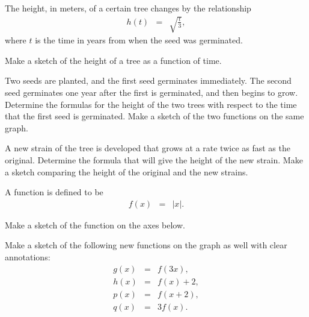 \begin{problem}
\item The height, in meters, of a certain tree changes by the
  relationship
  \begin{eqnarray*}
    h(t) & = & \sqrt{\frac{t}{3}},
  \end{eqnarray*}
  where $t$ is the time in years from when the seed was germinated. 
  \begin{subproblem}
  \item Make a sketch of the height of a tree as a function of time.
    \vfill
  \item Two seeds are planted, and the first seed germinates
    immediately. The second seed germinates one year after the first
    is germinated, and then begins to grow. Determine the formulas for
    the height of the two trees with respect to the time that the
    first seed is germinated. Make a sketch of the two functions on
    the same graph.  
    \vfill

  \item A new strain of the tree is developed that grows at a rate
    twice as fast as the original. Determine the formula that will
    give the height of the new strain. Make a sketch comparing the
    height of the original and the new strains.  
    \vfill
  \end{subproblem}

  \clearpage

\item A function is defined to be
  \begin{eqnarray*}
    f(x) & = & |x|.
  \end{eqnarray*}
  \begin{subproblem}
  \item Make a sketch of the function on the axes below.
  \item Make a sketch of the following new functions on the graph as
    well with clear annotations:
    \begin{eqnarray*}
      g(x) & = & f(3x), \\
      h(x) & = & f(x)+2, \\
      p(x) & = & f(x+2), \\
      q(x) & = & 3f(x).
    \end{eqnarray*}

    \hspace*{-6em}
    \scalebox{0.95}{}

  \end{subproblem}
\end{problem}

